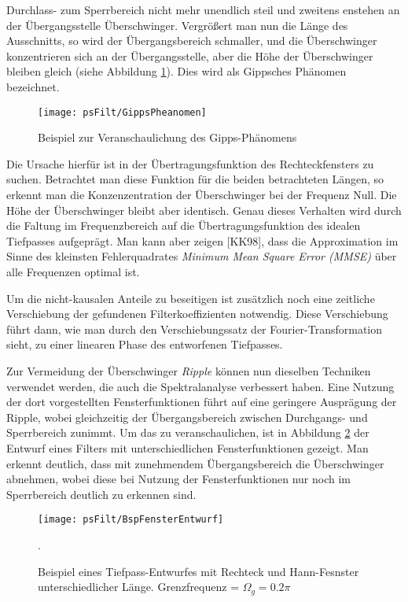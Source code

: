 Durchlass- zum Sperrbereich nicht mehr unendlich steil und zweitens enstehen an der Übergangsstelle
Überschwinger. Vergrößert man nun die Länge des Ausschnitts, so wird der Übergangsbereich schmaller,
und die Überschwinger konzentrieren sich an der Übergangsstelle, aber die Höhe der Überschwinger
bleiben gleich (siehe Abbildung \ref{pic:FIR:GippsBsp}). Dies wird als Gippsches Phänomen bezeichnet.
\begin{figure}[H]
\begin{center}
\texttt{[image: psFilt/GippsPheanomen]}
\caption{\label{pic:FIR:GippsBsp}Beispiel zur Veranschaulichung des Gipps-Phänomens}
\end{center}
\end{figure}

Die Ursache hierfür ist in der Übertragungsfunktion des Rechteckfensters zu suchen. Betrachtet
man diese Funktion für die beiden betrachteten Längen, so erkennt man die Konzenzentration der
Überschwinger bei der Frequenz Null. Die Höhe der Überschwinger bleibt aber identisch.
Genau dieses Verhalten wird durch die Faltung im Frequenzbereich auf die Übertragungsfunktion
des idealen Tiefpasses aufgeprägt. Man kann aber zeigen [KK98], dass die Approximation im
Sinne des kleinsten Fehlerquadrates {\em Minimum Mean Square Error (MMSE)} über
alle Frequenzen optimal ist.

Um die nicht-kausalen Anteile zu beseitigen ist zusätzlich noch eine zeitliche Verschiebung der
gefundenen Filterkoeffizienten notwendig. Diese Verschiebung führt dann, wie man durch den
Verschiebungssatz der Fourier-Transformation sieht, zu einer linearen Phase des entworfenen
Tiefpasses.

Zur Vermeidung der Überschwinger {\em Ripple} können nun dieselben Techniken verwendet werden, die auch die
Spektralanalyse verbessert haben. Eine Nutzung der dort vorgestellten Fensterfunktionen führt auf
eine geringere Ausprägung der Ripple, wobei gleichzeitig der Übergangsbereich zwischen
Durchgangs- und Sperrbereich zunimmt. Um das zu veranschaulichen, ist in Abbildung
\ref{pic:FIR:FensterEntwurf_1} der Entwurf eines Filters mit unterschiedlichen Fensterfunktionen
gezeigt. Man erkennt deutlich, dass mit zunehmendem Übergangsbereich die Überschwinger abnehmen, wobei
diese bei Nutzung der Fensterfunktionen nur noch im Sperrbereich deutlich zu erkennen sind.

\begin{figure}[H]
\begin{center}
\texttt{[image: psFilt/BspFensterEntwurf]}
\caption{\label{pic:FIR:FensterEntwurf_1}Beispiel eines Tiefpass-Entwurfes mit Rechteck und Hann-Fesnster
unterschiedlicher Länge. Grenzfrequenz = $\Omega_g = 0.2\pi$}.
\end{center}
\end{figure}

